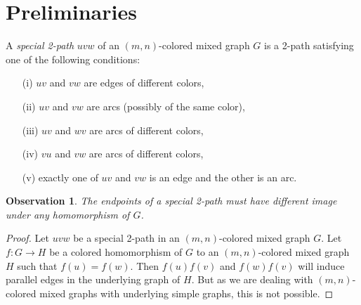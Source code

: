 \documentclass[11pt]{article}
\newtheorem{observation}{Observation}
\begin{document}
\section{Preliminaries}

A \textit{special 2-path} $uvw$ of an $(m,n)$-colored mixed graph $G$ is a 2-path satisfying one of the following conditions:

\begin{itemize}
\item[(i)] $uv$ and $vw$ are edges of different colors,

\item[(ii)] $uv$ and $vw$ are arcs (possibly of the same color),

\item[(iii)] $uv$ and $wv$ are arcs of different colors,

\item[(iv)] $vu$ and $vw$ are arcs of different colors,

\item[(v)] exactly one of $uv$ and $vw$ is an edge and the other is an arc.
\end{itemize}




\begin{observation}\label{special}
The endpoints of a special 2-path must have different image under any homomorphism of $G$.
\end{observation}

\begin{proof}
Let $uvw$ be a special 2-path in an $(m,n)$-colored mixed graph $G$. Let $f: G \rightarrow H$ be a colored homomorphism of $G$ to an
$(m,n)$-colored mixed graph $H$ such that $f(u) = f(w)$. Then $f(u)f(v)$ and $f(w)f(v)$  will induce parallel edges in the underlying graph of $H$.
But as we are dealing with $(m,n)$-colored mixed graphs with underlying simple graphs, this is not possible. 
\end{proof}
\end{document}
